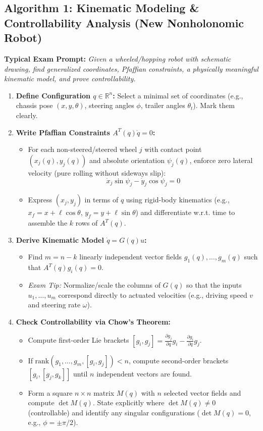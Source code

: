 \documentclass[10pt, a4paper]{article}
\begin{document}
\subsection*{Algorithm 1: Kinematic Modeling \& Controllability Analysis (New Nonholonomic Robot)}
\textbf{Typical Exam Prompt:} \textit{Given a wheeled/hopping robot with schematic drawing, find generalized coordinates, Pfaffian constraints, a physically meaningful kinematic model, and prove controllability.}
\begin{enumerate}
    \item \textbf{Define Configuration $q \in \mathbb{R}^n$:} Select a minimal set of coordinates (e.g., chassis pose $(x,y,\theta)$, steering angles $\phi$, trailer angles $\theta_t$). Mark them clearly.
    \item \textbf{Write Pfaffian Constraints $A^T(q)\dot{q} = 0$:}
    \begin{itemize}
        \item For each non-steered/steered wheel $j$ with contact point $(x_j(q), y_j(q))$ and absolute orientation $\psi_j(q)$, enforce zero lateral velocity (pure rolling without sideways slip):
        \[
            \dot{x}_j \sin\psi_j - \dot{y}_j \cos\psi_j = 0
        \]
        \item Express $(x_j, y_j)$ in terms of $q$ using rigid-body kinematics (e.g., $x_f = x + \ell\cos\theta$, $y_f = y + \ell\sin\theta$) and differentiate w.r.t. time to assemble the $k$ rows of $A^T(q)$.
    \end{itemize}
    \item \textbf{Derive Kinematic Model $\dot{q} = G(q)u$:}
    \begin{itemize}
        \item Find $m = n - k$ linearly independent vector fields $g_1(q), \dots, g_m(q)$ such that $A^T(q)g_i(q) = 0$.
        \item \textit{Exam Tip:} Normalize/scale the columns of $G(q)$ so that the inputs $u_1, \dots, u_m$ correspond directly to actuated velocities (e.g., driving speed $v$ and steering rate $\omega$).
    \end{itemize}
    \item \textbf{Check Controllability via Chow's Theorem:}
    \begin{itemize}
        \item Compute first-order Lie brackets $[g_i, g_j] = \frac{\partial g_j}{\partial q}g_i - \frac{\partial g_i}{\partial q}g_j$.
        \item If $\text{rank}(g_1, \dots, g_m, [g_i, g_j]) < n$, compute second-order brackets $[g_i, [g_j, g_k]]$ until $n$ independent vectors are found.
        \item Form a square $n \times n$ matrix $M(q)$ with $n$ selected vector fields and compute $\det M(q)$. State explicitly where $\det M(q) \neq 0$ (controllable) and identify any singular configurations ($\det M(q) = 0$, e.g., $\phi = \pm \pi/2$).
    \end{itemize}
\end{enumerate}
\end{document}
